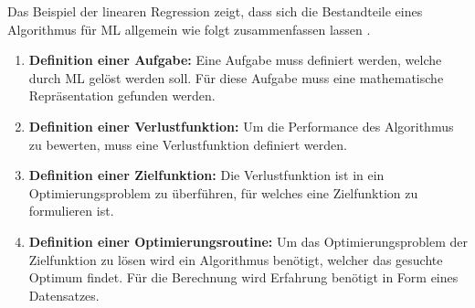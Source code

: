 
Das Beispiel der linearen Regression zeigt, dass sich die Bestandteile eines Algorithmus für \gls{ML} allgemein wie folgt zusammenfassen lassen \cite{Burkov.2019, Mitchell.1997, Goodfellow.2016}.

\begin{enumerate}
    \item \textbf{Definition einer Aufgabe:} Eine Aufgabe muss definiert werden, welche durch \gls{ML} gelöst werden soll. Für diese Aufgabe muss eine mathematische Repräsentation gefunden werden.
    \item \textbf{Definition einer \gls{Verlustfunktion}:} Um die Performance des Algorithmus zu bewerten, muss eine \gls{Verlustfunktion} definiert werden.
    \item \textbf{Definition einer \gls{Zielfunktion}:} Die \gls{Verlustfunktion} ist in ein Optimierungsproblem zu überführen, für welches eine \gls{Zielfunktion} zu formulieren ist.
    \item \textbf{Definition einer Optimierungsroutine:} Um das Optimierungsproblem der \gls{Zielfunktion} zu lösen wird ein Algorithmus benötigt, welcher das gesuchte Optimum findet. Für die Berechnung wird Erfahrung benötigt in Form eines Datensatzes.
\end{enumerate}